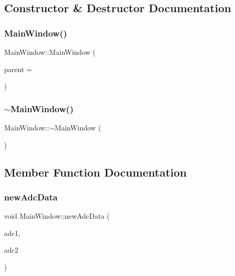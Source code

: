 \subsection{Constructor \& Destructor Documentation}
\mbox{\label{class_main_window_a8b244be8b7b7db1b08de2a2acb9409db}} 
\subsubsection{\texorpdfstring{Main\+Window()}{MainWindow()}}
{\footnotesize\ttfamily Main\+Window\+::\+Main\+Window (\begin{DoxyParamCaption}\item[{Q\+Widget $\ast$}]{parent = {} }\end{DoxyParamCaption})\hspace{0.3cm}{\ttfamily [explicit]}}

\mbox{\label{class_main_window_ae98d00a93bc118200eeef9f9bba1dba7}} 
\subsubsection{\texorpdfstring{$\sim$\+Main\+Window()}{~MainWindow()}}
{\footnotesize\ttfamily Main\+Window\+::$\sim$\+Main\+Window (\begin{DoxyParamCaption}{ }\end{DoxyParamCaption})}



\subsection{Member Function Documentation}
\mbox{\label{class_main_window_ab12446607d3535de4c195ce03d2c62c1}} 
\subsubsection{\texorpdfstring{new\+Adc\+Data}{newAdcData}}
{\footnotesize\ttfamily void Main\+Window\+::new\+Adc\+Data (\begin{DoxyParamCaption}\item[{int}]{adc1,  }\item[{int}]{adc2 }\end{DoxyParamCaption})\hspace{0.3cm}{\ttfamily [slot]}}



